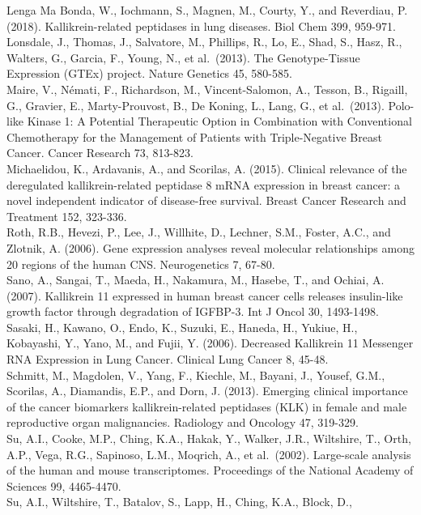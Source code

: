 \documentclass[
]{article}
\begin{document}
Lenga Ma Bonda, W., Iochmann, S., Magnen, M., Courty, Y., and Reverdiau,
P. (2018). Kallikrein-related peptidases in lung diseases. Biol Chem
399, 959-971.\\
Lonsdale, J., Thomas, J., Salvatore, M., Phillips, R., Lo, E., Shad, S.,
Hasz, R., Walters, G., Garcia, F., Young, N., et al.~(2013). The
Genotype-Tissue Expression (GTEx) project. Nature Genetics 45,
580-585.\\
Maire, V., Némati, F., Richardson, M., Vincent-Salomon, A., Tesson, B.,
Rigaill, G., Gravier, E., Marty-Prouvost, B., De Koning, L., Lang, G.,
et al.~(2013). Polo-like Kinase 1: A Potential Therapeutic Option in
Combination with Conventional Chemotherapy for the Management of
Patients with Triple-Negative Breast Cancer. Cancer Research 73,
813-823.\\
Michaelidou, K., Ardavanis, A., and Scorilas, A. (2015). Clinical
relevance of the deregulated kallikrein-related peptidase 8 mRNA
expression in breast cancer: a novel independent indicator of
disease-free survival. Breast Cancer Research and Treatment 152,
323-336.\\
Roth, R.B., Hevezi, P., Lee, J., Willhite, D., Lechner, S.M., Foster,
A.C., and Zlotnik, A. (2006). Gene expression analyses reveal molecular
relationships among 20 regions of the human CNS. Neurogenetics 7,
67-80.\\
Sano, A., Sangai, T., Maeda, H., Nakamura, M., Hasebe, T., and Ochiai,
A. (2007). Kallikrein 11 expressed in human breast cancer cells releases
insulin-like growth factor through degradation of IGFBP-3. Int J Oncol
30, 1493-1498.\\
Sasaki, H., Kawano, O., Endo, K., Suzuki, E., Haneda, H., Yukiue, H.,
Kobayashi, Y., Yano, M., and Fujii, Y. (2006). Decreased Kallikrein 11
Messenger RNA Expression in Lung Cancer. Clinical Lung Cancer 8,
45-48.\\
Schmitt, M., Magdolen, V., Yang, F., Kiechle, M., Bayani, J., Yousef,
G.M., Scorilas, A., Diamandis, E.P., and Dorn, J. (2013). Emerging
clinical importance of the cancer biomarkers kallikrein-related
peptidases (KLK) in female and male reproductive organ malignancies.
Radiology and Oncology 47, 319-329.\\
Su, A.I., Cooke, M.P., Ching, K.A., Hakak, Y., Walker, J.R., Wiltshire,
T., Orth, A.P., Vega, R.G., Sapinoso, L.M., Moqrich, A., et al.~(2002).
Large-scale analysis of the human and mouse transcriptomes. Proceedings
of the National Academy of Sciences 99, 4465-4470.\\
Su, A.I., Wiltshire, T., Batalov, S., Lapp, H., Ching, K.A., Block, D.,
\end{document}
